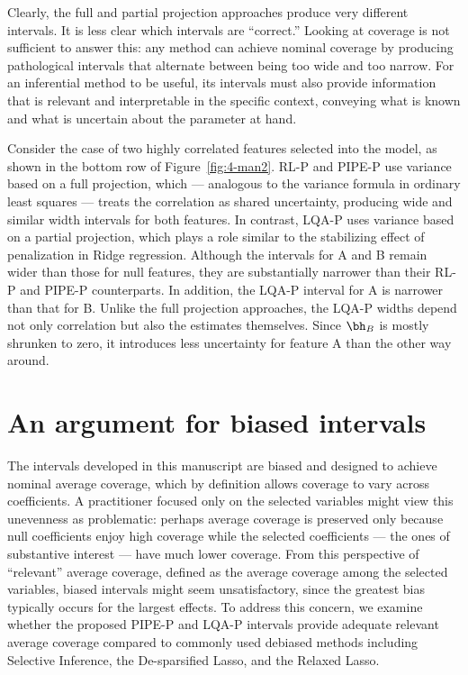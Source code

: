 Clearly, the full and partial projection approaches produce very different intervals. It is less clear which intervals are ``correct.'' Looking at coverage is not sufficient to answer this: any method can achieve nominal coverage by producing pathological intervals that alternate between being too wide and too narrow. For an inferential method to be useful, its intervals must also provide information that is relevant and interpretable in the specific context, conveying what is known and what is uncertain about the parameter at hand.

Consider the case of two highly correlated features selected into the model, as shown in the bottom row of Figure~\ref{fig:4-man2}. RL-P and PIPE-P use variance based on a full projection, which --- analogous to the variance formula in ordinary least squares --- treats the correlation as shared uncertainty, producing wide and similar width intervals for both features. In contrast, LQA-P uses variance based on a partial projection, which plays a role similar to the stabilizing effect of penalization in Ridge regression. Although the intervals for A and B remain wider than those for null features, they are substantially narrower than their RL-P and PIPE-P counterparts. In addition, the LQA-P interval for A is narrower than that for B. Unlike the full projection approaches, the LQA-P widths depend not only correlation but also the estimates themselves. Since $\bh_B$ is mostly shrunken to zero, it introduces less uncertainty for feature A than the other way around.

\section{An argument for biased intervals}
\label{sec:biased-intervals}

The intervals developed in this manuscript are biased and designed to achieve nominal average coverage, which by definition allows coverage to vary across coefficients. A practitioner focused only on the selected variables might view this unevenness as problematic: perhaps average coverage is preserved only because null coefficients enjoy high coverage while the selected coefficients --- the ones of substantive interest --- have much lower coverage. From this perspective of ``relevant'' average coverage, defined as the average coverage among the selected variables, biased intervals might seem unsatisfactory, since the greatest bias typically occurs for the largest effects. To address this concern, we examine whether the proposed PIPE-P and LQA-P intervals provide adequate relevant average coverage compared to commonly used debiased methods including Selective Inference, the De-sparsified Lasso, and the Relaxed Lasso.


